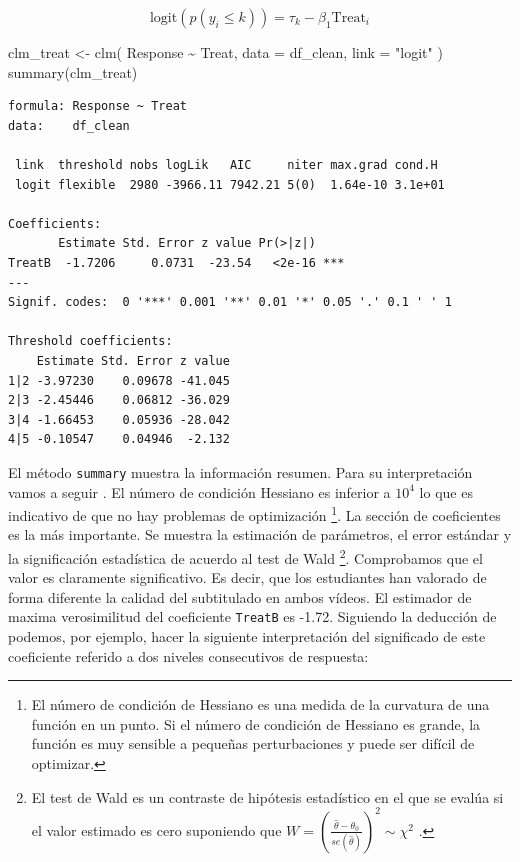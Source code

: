 \documentclass[
  12pt,
  a4paper,
  extrafontsizes,
  onecolumn,
  openright]{memoir}
\newenvironment{Shaded}{\begin{snugshade}}{\end{snugshade}}
\newcommand{\AttributeTok}[1]{\textcolor[rgb]{0.40,0.45,0.13}{#1}}
\newcommand{\FunctionTok}[1]{\textcolor[rgb]{0.28,0.35,0.67}{#1}}
\newcommand{\NormalTok}[1]{\textcolor[rgb]{0.00,0.23,0.31}{#1}}
\newcommand{\OtherTok}[1]{\textcolor[rgb]{0.00,0.23,0.31}{#1}}
\newcommand{\SpecialCharTok}[1]{\textcolor[rgb]{0.37,0.37,0.37}{#1}}
\newcommand{\StringTok}[1]{\textcolor[rgb]{0.13,0.47,0.30}{#1}}
\begin{document}
\[
\text{logit}(p(y_i \leq k)) = \tau_k - \beta_1 \text{Treat}_i
\]

\scriptsize

\begin{Shaded}
\begin{Highlighting}[]
\NormalTok{clm\_treat }\OtherTok{\textless{}{-}}
    \FunctionTok{clm}\NormalTok{(}
\NormalTok{        Response }\SpecialCharTok{\textasciitilde{}}\NormalTok{ Treat,}
        \AttributeTok{data =}\NormalTok{ df\_clean, }\AttributeTok{link =} \StringTok{"logit"}
\NormalTok{    )}
\FunctionTok{summary}\NormalTok{(clm\_treat)}
\end{Highlighting}
\end{Shaded}

\begin{verbatim}
formula: Response ~ Treat
data:    df_clean

 link  threshold nobs logLik   AIC     niter max.grad cond.H 
 logit flexible  2980 -3966.11 7942.21 5(0)  1.64e-10 3.1e+01

Coefficients:
       Estimate Std. Error z value Pr(>|z|)    
TreatB  -1.7206     0.0731  -23.54   <2e-16 ***
---
Signif. codes:  0 '***' 0.001 '**' 0.01 '*' 0.05 '.' 0.1 ' ' 1

Threshold coefficients:
    Estimate Std. Error z value
1|2 -3.97230    0.09678 -41.045
2|3 -2.45446    0.06812 -36.029
3|4 -1.66453    0.05936 -28.042
4|5 -0.10547    0.04946  -2.132
\end{verbatim}

\normalsize

El método \texttt{summary} muestra la información resumen. Para su
interpretación vamos a seguir \textcite{christensen2018CumulativeLM}. El
número de condición Hessiano es inferior a \(10^4\) lo que es indicativo
de que no hay problemas de optimización \footnote{El número de condición
  de Hessiano es una medida de la curvatura de una función en un punto.
  Si el número de condición de Hessiano es grande, la función es muy
  sensible a pequeñas perturbaciones y puede ser difícil de optimizar.}.
La sección de coeficientes es la más importante. Se muestra la
estimación de parámetros, el error estándar y la significación
estadística de acuerdo al test de Wald \footnote{El test de Wald es un
  contraste de hipótesis estadístico en el que se evalúa si el valor
  estimado es cero suponiendo que
  \(W = \left(\frac{\hat{\theta} - \theta_0}{se(\hat{\theta})}\right)^2 \sim \chi^{2}\)
  .}. Comprobamos que el valor es claramente significativo. Es decir,
que los estudiantes han valorado de forma diferente la calidad del
subtitulado en ambos vídeos. El estimador de maxima verosimilitud del
coeficiente \texttt{TreatB} es -1.72. Siguiendo la deducción de
\textcite{bruin2011} podemos, por ejemplo, hacer la siguiente
interpretación del significado de este coeficiente referido a dos
niveles consecutivos de respuesta:
\end{document}
